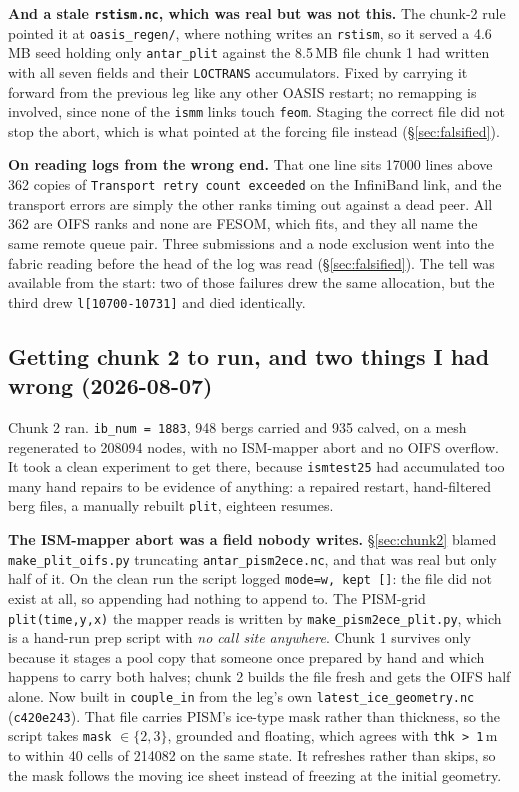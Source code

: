 \documentclass[11pt,a4paper]{article}
\newcommand{\code}[1]{\texttt{\small #1}}
\begin{document}
\medskip\noindent
\textbf{And a stale \code{rstism.nc}, which was real but was not this.} The chunk-2 rule pointed it
at \code{oasis\_regen/}, where nothing writes an \code{rstism}, so it served a 4.6\,MB seed holding
only \code{antar\_plit} against the 8.5\,MB file chunk 1 had written with all seven fields and
their \code{LOCTRANS} accumulators. Fixed by carrying it forward from the previous leg like any
other OASIS restart; no remapping is involved, since none of the \code{ismm} links touch
\code{feom}. Staging the correct file did not stop the abort, which is what pointed at the forcing
file instead (\S\ref{sec:falsified}).

\medskip\noindent
\textbf{On reading logs from the wrong end.} That one line sits 17000 lines above 362 copies of
\code{Transport retry count exceeded} on the InfiniBand link, and the transport errors are simply
the other ranks timing out against a dead peer. All 362 are OIFS ranks and none are FESOM, which
fits, and they all name the same remote queue pair. Three submissions and a node exclusion went
into the fabric reading before the head of the log was read (\S\ref{sec:falsified}). The tell was
available from the start: two of those failures drew the same allocation, but the third drew
\code{l[10700-10731]} and died identically.

\subsection{Getting chunk 2 to run, and two things I had wrong (2026-08-07)}
\label{sec:chunk2run}

Chunk 2 ran. \code{ib\_num = 1883}, 948 bergs carried and 935 calved, on a mesh regenerated to
208094 nodes, with no ISM-mapper abort and no OIFS overflow. It took a clean experiment to get
there, because \code{ismtest25} had accumulated too many hand repairs to be evidence of anything:
a repaired restart, hand-filtered berg files, a manually rebuilt \code{plit}, eighteen resumes.

\medskip\noindent
\textbf{The ISM-mapper abort was a field nobody writes.} \S\ref{sec:chunk2} blamed
\code{make\_plit\_oifs.py} truncating \code{antar\_pism2ece.nc}, and that was real but only half
of it. On the clean run the script logged \code{mode=w, kept []}: the file did not exist at all, so
appending had nothing to append to. The PISM-grid \code{plit(time,y,x)} the mapper reads is written
by \code{make\_pism2ece\_plit.py}, which is a hand-run prep script with \emph{no call site
anywhere}. Chunk 1 survives only because it stages a pool copy that someone once prepared by hand
and which happens to carry both halves; chunk 2 builds the file fresh and gets the OIFS half alone.
Now built in \code{couple\_in} from the leg's own \code{latest\_ice\_geometry.nc}
(\code{c420e243}). That file carries PISM's ice-type mask rather than thickness, so the script
takes \code{mask} $\in \{2,3\}$, grounded and floating, which agrees with \code{thk > 1}\,m to
within 40 cells of 214082 on the same state. It refreshes rather than skips, so the mask follows
the moving ice sheet instead of freezing at the initial geometry.
\end{document}
